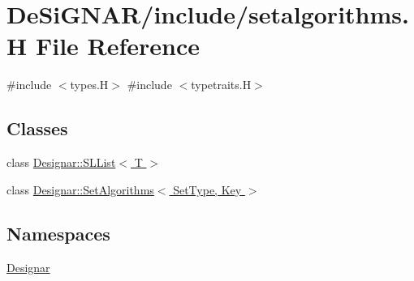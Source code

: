 \hypertarget{setalgorithms_8_h}{}\section{De\+Si\+G\+N\+A\+R/include/setalgorithms.H File Reference}
\label{setalgorithms_8_h}
{\ttfamily \#include $<$types.\+H$>$}\newline
{\ttfamily \#include $<$typetraits.\+H$>$}\newline
\subsection*{Classes}
\begin{DoxyCompactItemize}
\item 
class \hyperlink{class_designar_1_1_s_l_list}{Designar\+::\+S\+L\+List$<$ T $>$}
\item 
class \hyperlink{class_designar_1_1_set_algorithms}{Designar\+::\+Set\+Algorithms$<$ Set\+Type, Key $>$}
\end{DoxyCompactItemize}
\subsection*{Namespaces}
\begin{DoxyCompactItemize}
\item 
 \hyperlink{namespace_designar}{Designar}
\end{DoxyCompactItemize}
